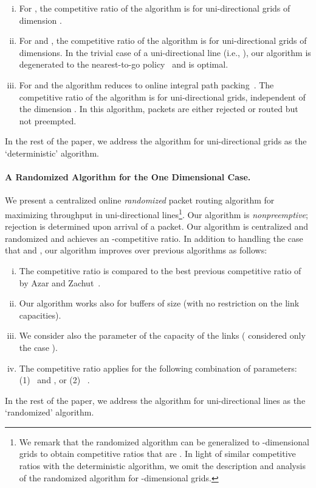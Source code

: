 \documentclass[11pt]{article}
\newenvironment{proof sketch}[1]{\noindent {\emph{Proof sketch of #1:}}}{\hfill \qed}
\begin{document}
\begin{enumerate}[(i)]
\item For , the competitive
    ratio of the algorithm is  for
    uni-directional grids of dimension .
\item For  and , the competitive ratio of
    the algorithm is  for
    uni-directional grids of  dimensions. In the
    trivial case of a uni-directional line (i.e., ),
    our algorithm is degenerated to the nearest-to-go
    policy~\cite{AKOR} and is optimal.
\item For  and  the
    algorithm reduces to online integral path
    packing~\cite{BN06,AAP}. The competitive ratio of the
    algorithm is  for uni-directional grids,
    independent of the dimension . In this algorithm,
    packets are either rejected or routed but not
    preempted.
\end{enumerate}
In the rest of the paper, we address the algorithm for
uni-directional grids as the `deterministic' algorithm.

\paragraph{A Randomized Algorithm for the One Dimensional Case.}
We present a centralized online \emph{randomized} packet
routing algorithm for maximizing throughput in
uni-directional lines\footnote{We remark that the
randomized
  algorithm can be generalized to -dimensional grids to obtain competitive ratios
  that are . In light of similar competitive ratios with the
  deterministic algorithm, we omit the description and analysis of the randomized
  algorithm for -dimensional grids.}. Our algorithm is \emph{nonpreemptive};
rejection is determined upon arrival of a packet. Our algorithm is centralized and
randomized and achieves an -competitive ratio. In addition to handling the
case that  and , our algorithm improves over previous algorithms as
follows:
\begin{enumerate}[(i)]
\item The competitive ratio is  compared to the best  previous competitive ratio of  by Azar and Zachut~\cite{AZ}.
\item Our algorithm works also for buffers of size  (with no restriction on
  the link capacities).
\item We consider also the parameter  of the capacity of the links (\cite{AZ,AKK} considered only the case ).
\item The  competitive ratio applies for the following combination of parameters:
  (1)~ and , or (2)~ .
\end{enumerate}
In the rest of the paper, we address the algorithm for
uni-directional lines as the `randomized' algorithm.
\end{document}
